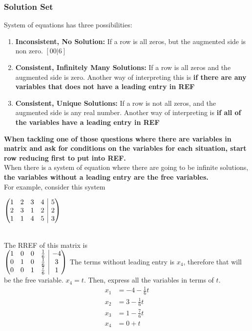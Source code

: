 \documentclass[12pt]{article}
\makeatletter
\newenvironment{amatrix}[1]{%
  \left(\begin{array}{@{}*{#1}{c}|c@{}}
}{%
  \end{array}\right)
}
\makeatother
\begin{document}
\subsubsection{Solution Set}
System of equations has three possibilities:
\begin{enumerate}
\item \textbf{Inconsistent, No Solution:} If a row is all zeros, but the augmented side is non zero. $[0 0|6]$
\item \textbf{Consistent, Infinitely Many Solutions:} If a row is all zeros and the augmented side is zero. Another way of interpreting this is \textbf{if there are any variables that does not have a leading entry in REF}
\item \textbf{Consistent, Unique Solutions:} If a row is not all zeros, and the augmented side is any real number. Another way of interpreting is \textbf{if all of the variables have a leading entry in REF}
\end{enumerate}
\textbf{When tackling one of those questions where there are variables in matrix and ask for conditions on the variables for each situation, start row reducing first to put into REF.}\\
When there is a system of equation where there are going to be infinite solutions, \textbf{the variables without a leading entry are the free variables.}\\
For example, consider this system\\
\begin{centering}
$
\begin{amatrix}{4}
   1 & 2 & 3 &4 &5 \\ 2 & 3 &1 &2 & 2\\1&1&4&5&3\\ 
 \end{amatrix}
$
\end{centering}\\
The RREF of this matrix is\\
$
\begin{amatrix}{4}
   1 & 0 & 0 & \frac{1}{6} &-4 \\ 0 & 1 &0 &\frac{1}{6} & 3\\ 0& 0& 1& \frac{7}{6}& 1\\ 
 \end{amatrix}
$
The terms without leading entry is $x_4$, therefore that will be the free variable. $x_4 = t$.
Then, express all the variables in terms of $t$.\\
\begin{equation}
\begin{split}
x_1 &= -4 - \frac{1}{6}t\\
x_2 &= 3 - \frac{1}{6}t\\
x_3 &= 1-\frac{7}{6}t\\
x_4 &= 0 + t\\
\end{split}
\end{equation}
\end{document}
